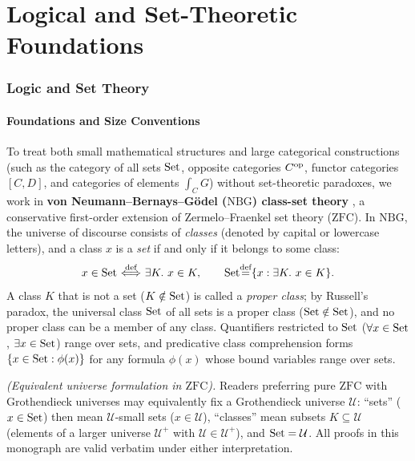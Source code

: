 \documentclass[10pt,a4paper]{article}
\begin{document}
\tableofcontents

\part{Logical and Set-Theoretic Foundations}\label{part:foundations}
\section{Logic and Set Theory}\label{sec:logic_set}

\subsection{Foundations and Size Conventions}\label{sec:foundations}
To treat both small mathematical structures and large categorical constructions (such as the category of all sets ${\textrm{Set}}$, opposite categories $C^{\textrm{op}}$, functor categories $[C, D]$, and categories of elements $\int_C G$) without set-theoretic paradoxes, we work in \textbf{von Neumann--Bernays--G\"odel ($\mathrm{NBG}$) class-set theory} \cite{Godel1940,Bernays1958,Mendelson2015,TakeutiZaring1982}, a conservative first-order extension of Zermelo--Fraenkel set theory ($\mathrm{ZFC}$). In $\mathrm{NBG}$, the universe of discourse consists of \emph{classes} (denoted by capital or lowercase letters), and a class $x$ is a \emph{set} if and only if it belongs to some class:
$$x \in {\textrm{Set}} {\stackrel{{\textrm{def}}}{\ \Longleftrightarrow\ }} \exists K.\ x \in K, \qquad {\textrm{Set}} {\stackrel{{\textrm{def}}}{=}} \{x : \exists K.\ x \in K\}.$$
A class $K$ that is not a set ($K \notin {\textrm{Set}}$) is called a \emph{proper class}; by Russell's paradox, the universal class ${\textrm{Set}}$ of all sets is a proper class (${\textrm{Set}} \notin {\textrm{Set}}$), and no proper class can be a member of any class. Quantifiers restricted to ${\textrm{Set}}$ ($\forall x \in {\textrm{Set}}$, $\exists x \in {\textrm{Set}}$) range over sets, and predicative class comprehension forms $\{x \in {\textrm{Set}} : \phi(x)\}$ for any formula $\phi(x)$ whose bound variables range over sets.

\emph{(Equivalent universe formulation in $\mathrm{ZFC}$).} Readers preferring pure $\mathrm{ZFC}$ with Grothendieck universes \cite{SGA4,MacLane1998,Borceux1994} may equivalently fix a Grothendieck universe $\mathcal{U}$: ``sets'' ($x \in {\textrm{Set}}$) then mean $\mathcal{U}$-small sets ($x \in \mathcal{U}$), ``classes'' mean subsets $K \subseteq \mathcal{U}$ (elements of a larger universe $\mathcal{U}^+$ with $\mathcal{U} \in \mathcal{U}^+$), and ${\textrm{Set}} = \mathcal{U}$. All proofs in this monograph are valid verbatim under either interpretation.
\end{document}
